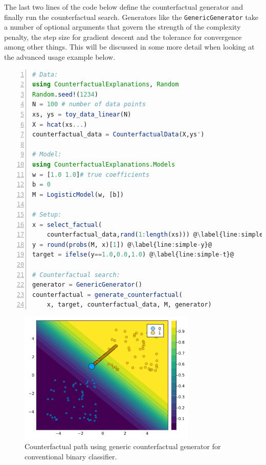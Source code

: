 \documentclass{juliacon}
\begin{document}
The last two lines of the code below define the counterfactual generator
and finally run the counterfactual search. Generators like the
\texttt{GenericGenerator} take a number of optional arguments that
govern the strength of the complexity penalty, the step size for
gradient descent and the tolerance for convergence among other things.
This will be discussed in some more detail when looking at the advanced
usage example below.

\begin{lstlisting}[language=Julia, escapechar=@, numbers=left, label={lst:simple}, caption={}] 
# Data:
using CounterfactualExplanations, Random
Random.seed!(1234)
N = 100 # number of data points
xs, ys = toy_data_linear(N)
X = hcat(xs...)
counterfactual_data = CounterfactualData(X,ys')

# Model:
using CounterfactualExplanations.Models 
w = [1.0 1.0]# true coefficients
b = 0
M = LogisticModel(w, [b])

# Setup:
x = select_factual(
    counterfactual_data,rand(1:length(xs))) @\label{line:simple-x}@
y = round(probs(M, x)[1]) @\label{line:simple-y}@
target = ifelse(y==1.0,0.0,1.0) @\label{line:simple-t}@

# Counterfactual search:
generator = GenericGenerator()
counterfactual = generate_counterfactual(
    x, target, counterfactual_data, M, generator)
\end{lstlisting}

\begin{figure}

{\centering \includegraphics[width=3.33333in,height=2.5in]{www/ce_binary.png}

}

\caption{\label{fig-binary}Counterfactual path using generic
counterfactual generator for conventional binary classifier.}

\end{figure}
\end{document}
